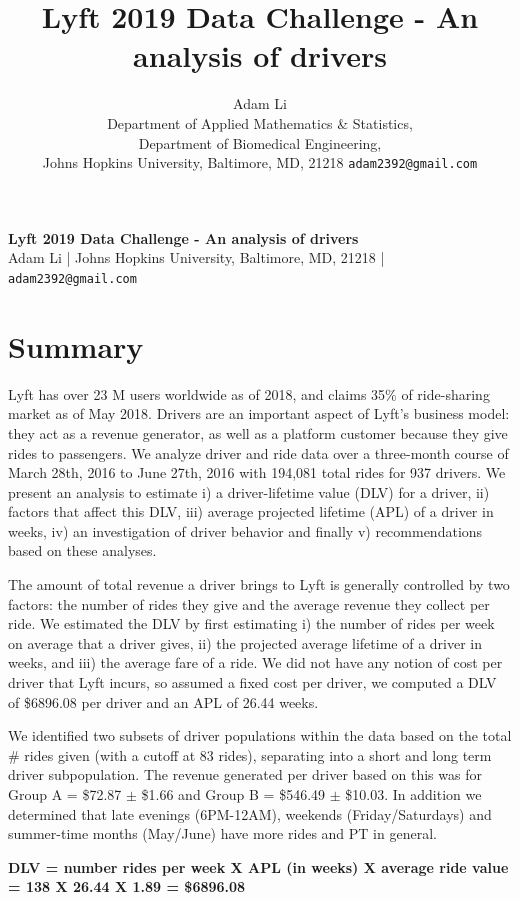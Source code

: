 \documentclass{report}
\title{Lyft 2019 Data Challenge - An analysis of drivers}
\author{
  Adam Li \\
  Department of Applied Mathematics \& Statistics, \\
  Department of Biomedical Engineering, \\
  Johns Hopkins University, Baltimore, MD, 21218
  \texttt{adam2392@gmail.com} 
}
\begin{document}

\textbf{Lyft 2019 Data Challenge - An analysis of drivers}\\
Adam Li | Johns Hopkins University, Baltimore, MD, 21218 | \texttt{adam2392@gmail.com} 

\section{Summary}
	Lyft has over 23 M users worldwide as of 2018, and claims 35\% of ride-sharing market as of May 2018. Drivers are an important aspect of Lyft's business model: they act as a revenue generator, as well as a platform customer because they give rides to passengers. We analyze driver and ride data over a three-month course of March 28th, 2016 to June 27th, 2016 with 194,081 total rides for 937 drivers. We present an analysis to estimate i) a driver-lifetime value (DLV) for a driver, ii) factors that affect this DLV, iii) average projected lifetime (APL) of a driver in weeks, iv) an investigation of driver behavior and finally v) recommendations based on these analyses.

	The amount of total revenue a driver brings to Lyft is generally controlled by two factors: the number of rides they give and the average revenue they collect per ride. We estimated the DLV by first estimating i) the number of rides per week on average that a driver gives, ii) the projected average lifetime of a driver in weeks, and iii) the average fare of a ride. We did not have any notion of cost per driver that Lyft incurs, so assumed a fixed cost per driver, we computed a DLV of \$6896.08 per driver and an APL of 26.44 weeks.

	We identified two subsets of driver populations within the data based on the total \# rides given (with a cutoff at 83 rides), separating into a short and long term driver subpopulation. The revenue generated per driver based on this was for Group A = \$72.87 $\pm$ \$1.66 and Group B = \$546.49 $\pm$ \$10.03. In addition we determined that late evenings (6PM-12AM), weekends (Friday/Saturdays) and summer-time months (May/June) have more rides and PT in general.

	\textbf{DLV = number rides per week X APL (in weeks) X average ride value = 138 X 26.44 X 1.89 = \$6896.08} 
\end{document}
